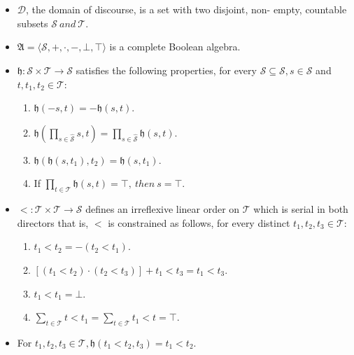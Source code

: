 \begin{itemize}
	\item $\mathcal{D}$, the domain of discourse, is a set with two disjoint, non-
	      empty, countable subsets $\mathcal{S}  \ and\  \mathcal{T}$.
	\item $\mathfrak{A} = \langle \mathcal{S}, +, \cdot, -, \bot, \top \rangle $ is a
	      complete Boolean algebra.
	\item $\mathfrak{h} : \mathcal{S} \times \mathcal{T} \to \mathcal{S}$ satisfies the following properties,
	      for every $\hat{\mathcal{S}} \subseteq \mathcal{S}, s \in \mathcal{S}$ and $t, t_1, t_2 \in \mathcal{T}$:
	      \begin{enumerate}
		      \item $\mathfrak{h}(-s, t)= -  \mathfrak{h}(s, t)$.
		      \item $\displaystyle \mathfrak{h}(\prod_{s\in \hat{\mathcal{S}}} s, t) = \prod_{s\in \hat{\mathcal{S}}} \mathfrak{h}(s, t)$.
		      \item $\mathfrak{h}(\mathfrak{h}(s, t_1), t_2) = \mathfrak{h}(s, t_1)$.
		      \item If $\displaystyle \prod_{t \in \mathcal{T}} \mathfrak{h}(s, t)= \top, \ then \ s = \top$.
	      \end{enumerate}
	\item $< : \mathcal{T} \times \mathcal{T} \to \mathcal{S}$ defines an irreflexive linear order on $\mathcal{T}$ which is serial in both
	      directors that is, $<$ is constrained as follows, for every distinct $t_1, t_2, t_3 \in \mathcal{T}$:
	      \begin{enumerate}
		      \item $t_1 < t_2 = - (t_2 < t_1)$.
		      \item $[(t_1 < t_2) \cdot (t_2 < t_3)] + t_1 < t_3 = t_1 < t_3$.
		      \item $t_1 < t_1 = \bot$.
		      \item $\sum_{t \in \mathcal{T}} t < t_1 = \sum_{t \in \mathcal{T}} t_1 < t = \top$.
	      \end{enumerate}
	\item For $t_1, t_2, t_3 \in \mathcal{T}, \mathfrak{h}(t_1 < t_2, t_3) = t_1 < t_2$.
\end{itemize}

